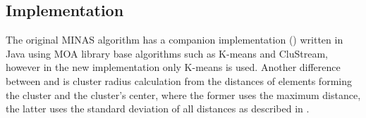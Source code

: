 



\subsection{Implementation}\label{sec:implementation}

The original MINAS algorithm has a companion implementation ()
written in Java using MOA library base algorithms such as K-means and CluStream,
however in the new implementation only K-means is used.
Another difference between  and \mfog is cluster radius calculation
from the distances of elements forming the cluster and the cluster's center,
where the former uses the maximum distance, the latter uses the standard deviation
of all distances as described in \cite{Faria2016minas}.



